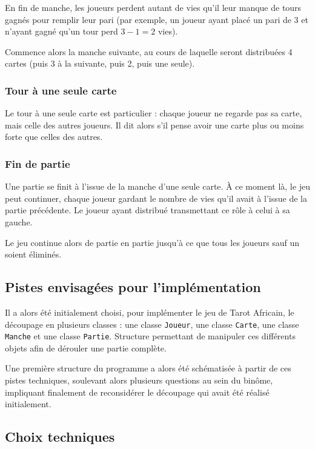         En fin de manche, les joueurs perdent autant de vies qu'il leur manque de tours gagnés pour remplir leur pari (par exemple, un joueur ayant placé un pari de 3 et n'ayant gagné qu'un tour perd $3-1 = 2$ vies).

         Commence alors la manche suivante, au cours de laquelle seront distribuées 4 cartes (puis 3 à la suivante, puis 2, puis une seule).
      \subsubsection{Tour à une seule carte}
         Le tour à une seule carte est particulier : chaque joueur ne regarde pas sa carte, mais celle des autres joueurs.
         Il dit alors s'il pense avoir une carte plus ou moins forte que celles des autres.
      \subsubsection{Fin de partie}
         Une partie se finit à l'issue de la manche d'une seule carte.
         À ce moment là, le jeu peut continuer, chaque joueur gardant le nombre de vies qu'il avait à l'issue de la partie précédente.
         Le joueur ayant distribué transmettant ce rôle à celui à sa gauche.

         Le jeu continue alors de partie en partie jusqu'à ce que tous les joueurs sauf un soient éliminés.

   \subsection{Pistes envisagées pour l'implémentation}\label{subsec:pistes-envisagées-pour-l'implémentation}
      Il a alors été initialement choisi, pour implémenter le jeu de Tarot Africain, le découpage en plusieurs classes : une classe \texttt{Joueur}, une classe \texttt{Carte}, une classe \texttt{Manche} et une classe \texttt{Partie}.
      Structure permettant de manipuler ces différents objets afin de dérouler une partie complète.

      Une première structure du programme a alors été schématisée à partir de ces pistes techniques, soulevant alors plusieurs questions au sein du binôme, impliquant finalement de reconsidérer le découpage qui avait été réalisé initialement.

   \subsection{Choix techniques}\label{subsec:choix-techniques}


